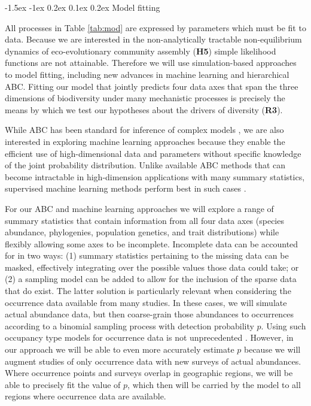\documentclass[11pt]{article}
\makeatletter
\renewcommand\subsubsection{\@startsection{subsection}{1}{\z@}%
                                  {-1.5ex \@plus -1ex \@minus 0.2ex}%
                                  {0.1ex \@plus 0.2ex}%
                                  {\normalfont\bfseries}}
\makeatother
\begin{document}
\subsubsection{Model fitting}\label{model-fitting}

All processes in Table \ref{tab:mod} are expressed by parameters which
must be fit to data. Because we are interested in the non-analytically
tractable non-equilibrium dynamics of eco-evolutionary community
assembly (\textbf{H5}) simple likelihood functions are not attainable.
Therefore we will use simulation-based approaches to model fitting,
including new advances in machine learning and hierarchical
ABC. Fitting our model that jointly predicts four data axes that span
the three dimensions of biodiversity under many mechanistic processes
is precisely the means by which we test our hypotheses about the
drivers of diversity (\textbf{R3}).

While ABC has been standard for inference of complex models
\cite{Beaumont2010-si}, we are also interested in exploring machine
learning approaches because they enable the efficient use of
high-dimensional data and parameters without specific knowledge of the
joint probability distribution. Unlike available ABC methods that can
become intractable in high-dimension applications with many summary
statistics, supervised machine learning methods perform best in
such cases \cite{Anderson2014-fi,Breiman2001-ux}. 

For our ABC and machine learning approaches we will explore a range of
summary statistics that contain information from all four data axes
(species abundance, phylogenies, population genetics, and trait
distributions) while flexibly allowing some axes to be incomplete.
Incomplete data can be accounted for in two ways: (1) summary
statistics pertaining to the missing data can be masked, effectively
integrating over the possible values those data could take; or (2) a
sampling model can be added to allow for the inclusion of the sparse
data that do exist. The latter solution is particularly relevant when
considering the occurrence data available from many studies. In these
cases, we will simulate actual abundance data, but then coarse-grain
those abundances to occurrences according to a binomial sampling
process with detection probability $p$. Using such occupancy type
models for occurrence data is not unprecedented
\cite{Tingley2009-kt}. However, in our approach we will be able to
even more accurately estimate $p$ because we will augment studies of
only occurrence data with new surveys of actual abundances.  Where
occurrence points and surveys overlap in geographic regions, we will
be able to precisely fit the value of $p$, which then will be carried
by the model to all regions where occurrence data are available.
\end{document}
